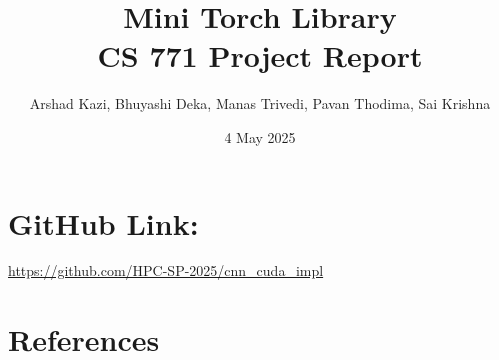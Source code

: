 \documentclass{article}
\title{Mini Torch Library\\CS 771 Project Report}
\author{Arshad Kazi, Bhuyashi Deka, Manas Trivedi, Pavan Thodima, Sai Krishna}
\date{4 May 2025}
\begin{document}
\maketitle

\section*{GitHub Link:} \url{https://github.com/HPC-SP-2025/cnn_cuda_impl}











\section{References}
\printbibliography



\end{document}
